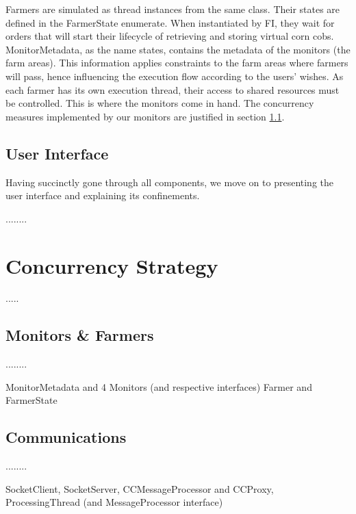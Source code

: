 \documentclass[12pt]{article}
\begin{document}
Farmers are simulated as thread instances from the same class.
Their states are defined in the FarmerState enumerate.
When instantiated by FI, they wait for orders that will start their lifecycle of retrieving and storing virtual corn cobs.
MonitorMetadata, as the name states, contains the metadata of the monitors (the farm areas).
This information applies constraints to the farm areas where farmers will pass, hence influencing the execution flow according to the users' wishes.
As each farmer has its own execution thread, their access to shared resources must be controlled.
This is where the monitors come in hand. 
The concurrency measures implemented by our monitors are justified in section \ref{monitors_and_farmers}. 

\subsection{User Interface} %

Having succinctly gone through all components, we move on to presenting the user interface and explaining its confinements.

........

\newpage
\section{Concurrency Strategy} %

..... 

\subsection{Monitors \& Farmers} \label{monitors_and_farmers} %

........

MonitorMetadata and 4 Monitors (and respective interfaces)
Farmer and FarmerState

\subsection{Communications} \label{communications} %

........

SocketClient, SocketServer, CCMessageProcessor and CCProxy, ProcessingThread (and MessageProcessor interface)
\end{document}
